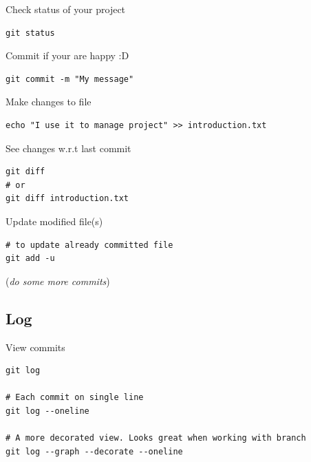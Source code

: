 \documentclass[10pt]{beamer}
\begin{document}
\begin{frame}[fragile,label={sec:org5ed31e6}]{Check status of your project}
 \begin{verbatim}
git status
\end{verbatim}
\end{frame}

\begin{frame}[fragile,label={sec:orga162fb0}]{Commit if your are happy :D}
 \begin{verbatim}
git commit -m "My message"
\end{verbatim}
\end{frame}


\begin{frame}[fragile,label={sec:org6d0cd34}]{Make changes to file}
 \begin{verbatim}
echo "I use it to manage project" >> introduction.txt
\end{verbatim}
\end{frame}

\begin{frame}[fragile,label={sec:orga3651fe}]{See changes w.r.t last commit}
 \begin{verbatim}
git diff
# or
git diff introduction.txt
\end{verbatim}
\end{frame}


\begin{frame}[fragile,label={sec:org4a50f2e}]{Update modified file(s)}
 \begin{verbatim}
# to update already committed file
git add -u
\end{verbatim}

(\emph{do some more commits})
\end{frame}

\subsection{Log}
\label{sec:orgd3bbb13}
\begin{frame}[fragile,label={sec:orgdb5a94c}]{View commits}
 \begin{verbatim}
git log

# Each commit on single line
git log --oneline

# A more decorated view. Looks great when working with branch
git log --graph --decorate --oneline
\end{verbatim}
\end{frame}
\end{document}
